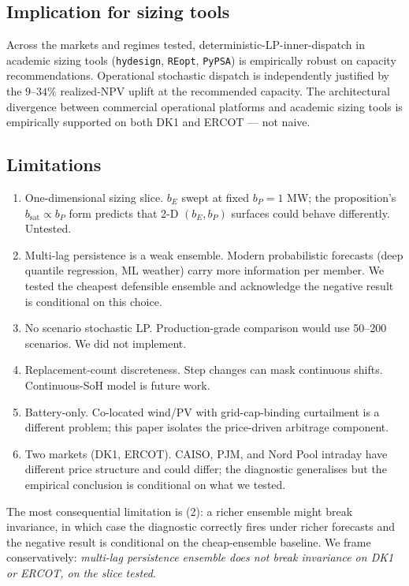 \documentclass[11pt]{article}
\begin{document}
\subsection{Implication for sizing tools}

Across the markets and regimes tested, deterministic-LP-inner-dispatch in academic sizing tools (\texttt{hydesign}, \texttt{REopt}, \texttt{PyPSA}) is empirically robust on capacity recommendations. Operational stochastic dispatch is independently justified by the $9$--$34\%$ realized-NPV uplift at the recommended capacity. The architectural divergence between commercial operational platforms and academic sizing tools is empirically supported on both DK1 and ERCOT --- not naive.

\subsection{Limitations}

\begin{enumerate}
\item One-dimensional sizing slice. $b_E$ swept at fixed $b_P = 1$ MW; the proposition's $b_{\mathrm{sat}} \propto b_P$ form predicts that 2-D $(b_E, b_P)$ surfaces could behave differently. Untested.
\item Multi-lag persistence is a weak ensemble. Modern probabilistic forecasts (deep quantile regression, ML weather) carry more information per member. We tested the cheapest defensible ensemble and acknowledge the negative result is conditional on this choice.
\item No scenario stochastic LP. Production-grade comparison \citep{birge1997stochastic, krishnamurthy2018stochastic} would use 50--200 scenarios. We did not implement.
\item Replacement-count discreteness. Step changes can mask continuous shifts. Continuous-SoH model is future work.
\item Battery-only. Co-located wind/PV with grid-cap-binding curtailment is a different problem; this paper isolates the price-driven arbitrage component.
\item Two markets (DK1, ERCOT). CAISO, PJM, and Nord Pool intraday have different price structure and could differ; the diagnostic generalises but the empirical conclusion is conditional on what we tested.
\end{enumerate}

The most consequential limitation is (2): a richer ensemble might break invariance, in which case the diagnostic correctly fires under richer forecasts and the negative result is conditional on the cheap-ensemble baseline. We frame conservatively: \emph{multi-lag persistence ensemble does not break invariance on DK1 or ERCOT, on the slice tested}.
\end{document}
